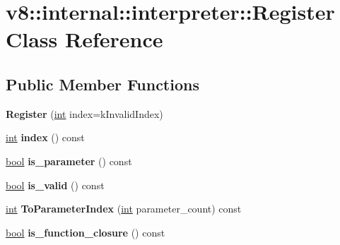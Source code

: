 \hypertarget{classv8_1_1internal_1_1interpreter_1_1Register}{}\section{v8\+:\+:internal\+:\+:interpreter\+:\+:Register Class Reference}
\label{classv8_1_1internal_1_1interpreter_1_1Register}
\subsection*{Public Member Functions}
\begin{DoxyCompactItemize}
\item 
\mbox{\label{classv8_1_1internal_1_1interpreter_1_1Register_ae22123d22e3c2463c7f344f53dab0664}} 
{\bfseries Register} (\mbox{\hyperlink{classint}{int}} index=k\+Invalid\+Index)
\item 
\mbox{\label{classv8_1_1internal_1_1interpreter_1_1Register_af7a7ae2ca532b769fa8f89039a6f1e94}} 
\mbox{\hyperlink{classint}{int}} {\bfseries index} () const
\item 
\mbox{\label{classv8_1_1internal_1_1interpreter_1_1Register_ad87ce37da81f7317cf16ba53e00eb8ae}} 
\mbox{\hyperlink{classbool}{bool}} {\bfseries is\+\_\+parameter} () const
\item 
\mbox{\label{classv8_1_1internal_1_1interpreter_1_1Register_ad4457be3a78b660254ae4f28990ed277}} 
\mbox{\hyperlink{classbool}{bool}} {\bfseries is\+\_\+valid} () const
\item 
\mbox{\label{classv8_1_1internal_1_1interpreter_1_1Register_abfedbb080f148fc66e015d2d41859ce8}} 
\mbox{\hyperlink{classint}{int}} {\bfseries To\+Parameter\+Index} (\mbox{\hyperlink{classint}{int}} parameter\+\_\+count) const
\item 
\mbox{\label{classv8_1_1internal_1_1interpreter_1_1Register_a586b326e293f390e77c30bd186122d07}} 
\mbox{\hyperlink{classbool}{bool}} {\bfseries is\+\_\+function\+\_\+closure} () const

\end{DoxyCompactItemize}
